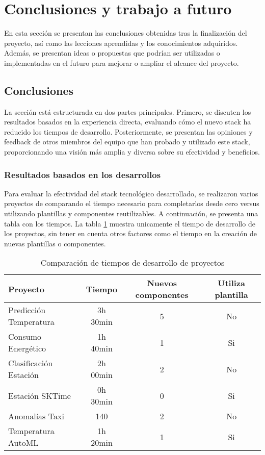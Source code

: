 \section{Conclusiones y trabajo a futuro}
En esta sección se presentan las conclusiones obtenidas tras la finalización 
del proyecto, así como las lecciones aprendidas y los conocimientos adquiridos. 
Además, se presentan ideas o propuestas que podrían ser utilizadas o implementadas 
en el futuro para mejorar o ampliar el alcance del proyecto.

\subsection{Conclusiones}
La sección está estructurada en dos partes principales. Primero, se discuten los 
resultados basados en la experiencia directa, evaluando cómo el nuevo stack ha 
reducido los tiempos de desarrollo. Posteriormente, se presentan las opiniones 
y feedback de otros miembros del equipo que han probado y utilizado este stack, 
proporcionando una visión más amplia y diversa sobre su efectividad y beneficios.

\subsubsection{Resultados basados en los desarrollos}
Para evaluar la efectividad del stack tecnológico desarrollado, se realizaron 
varios proyectos de comparando el tiempo necesario para completarlos 
desde cero versus utilizando plantillas y componentes reutilizables. A continuación, 
se presenta una tabla con los tiempos. La tabla \ref{tabla:result-time-scores} 
muestra unicamente el tiempo de desarrollo de los proyectos, sin tener en cuenta
otros factores como el tiempo en la creación de nuevas plantillas o componentes.

\begin{table}[h!]
    \centering
    \begin{tabular}{|l|c|c|c|}
    \hline
    \textbf{Proyecto} & \textbf{Tiempo} & \textbf{Nuevos componentes} & \textbf{Utiliza plantilla} \\
    \hline
    Predicción Temperatura & 3h 30min & 5 & No \\
    \hline
    Consumo Energético & 1h 40min & 1 & Si \\
    \hline
    Clasificación Estación & 2h 00min & 2 & No \\
    \hline
    Estación SKTime & 0h 30min & 0 & Si \\
    \hline
    Anomalías Taxi & 140 & 2 & No \\
    \hline
    Temperatura AutoML & 1h 20min & 1 & Si \\
    \hline
    \end{tabular}
    \caption{Comparación de tiempos de desarrollo de proyectos}
    \label{tabla:result-time-scores}
\end{table}

